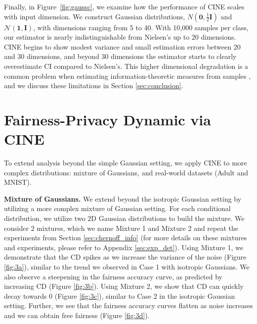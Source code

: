 \documentclass[11pt,letterpaper]{article}
\begin{document}
Finally, in Figure~\ref{fig:gaussc}, we examine how the performance of CINE scales with input dimension. We construct Gaussian distributions, $N(\mathbf{0}, \frac{1}{2}\mathbf{I})$ and $\mathcal{N}(\mathbf{1}, \mathbf{I})$, with dimensions ranging from 5 to 40. With 10,000 samples per class, our estimator is nearly indistinguishable from Nielsen’s up to 20 dimensions. CINE begins to show modest variance and small estimation errors between 20 and 30 dimensions, and beyond 30 dimensions the estimator starts to clearly overestimate CI compared to Nielsen's. 
%
This higher dimensional degradation is a common problem when estimating information-theoretic measures from samples \citep{belghazi2018mine}, and we discuss these limitations in Section \ref{sec:conclusion}. 

\section{Fairness-Privacy Dynamic via CINE} \label{sec:real_data}
To extend analysis beyond the simple Gaussian setting, we apply CINE to  more complex distributions: mixture of Gaussians, and real-world datasets (Adult and MNIST).


\textbf{Mixture of Gaussians.} We extend beyond the isotropic Gaussian setting by utilizing a more complex mixture of Gaussian setting. For each conditional distribution, we utilize two 2D Gaussian distributions to build the mixture. We consider 2 mixtures, which we name Mixture 1 and Mixture 2 and repeat the experiments from Section \ref{sec:chernoff_info} (for more details on these mixtures and experiments, please refer to Appendix \ref{sec:exp_det}). Using Mixture 1, we demonstrate that the CD spikes as we increase the variance of the noise (Figure \ref{fig:3a}), similar to the trend we observed in Case 1 with isotropic Gaussians. We also observe a steepening in the fairness accuracy curve, as predicted by increasing CD (Figure \ref{fig:3b}). Using Mixture 2, we show that CD can quickly decay towards 0 (Figure \ref{fig:3c}), similar to Case 2 in the isotropic Gaussian setting. Further, we see that the fairness accuracy curves flatten as noise increases and we can obtain free fairness (Figure \ref{fig:3d}). 
\end{document}
